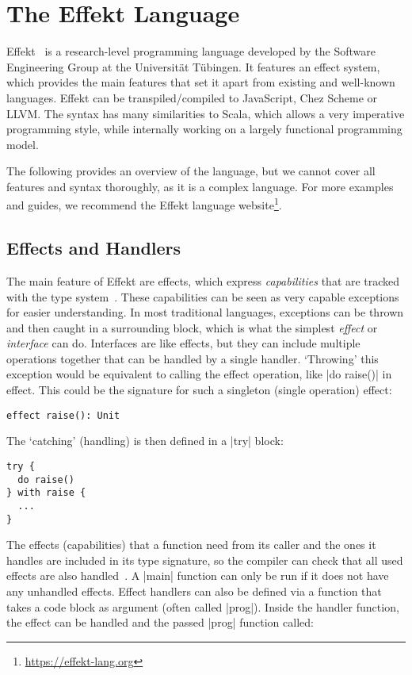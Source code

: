 \chapter{The Effekt Language}\label{chap:effekt}

Effekt~\cite{brachthauser2020effects} is a research-level programming language developed by the Software Engineering Group at the Universität Tübingen. It features an effect system, which provides the main features that set it apart from existing and well-known languages. Effekt can be transpiled/compiled to JavaScript, Chez Scheme or LLVM. The syntax has many similarities to Scala, which allows a very imperative programming style, while internally working on a largely functional programming model.

The following provides an overview of the language, but we cannot cover all features and syntax thoroughly, as it is a complex language. For more examples and guides, we recommend the Effekt language website\footnote{\url{https://effekt-lang.org}}.

\section{Effects and Handlers}

The main feature of Effekt are effects, which express \textit{capabilities} that are tracked with the type system~\cite{brachthauser2020effects}. These capabilities can be seen as very capable exceptions for easier understanding. In most traditional languages, exceptions can be thrown and then caught in a surrounding block, which is what the simplest \textit{effect} or \textit{interface} can do. Interfaces are like effects, but they can include multiple operations together that can be handled by a single handler. `Throwing' this exception would be equivalent to calling the effect operation, like |do raise()| in effect. This could be the signature for such a singleton (single operation) effect:

\begin{lstlisting}
effect raise(): Unit
\end{lstlisting}

The `catching' (handling) is then defined in a |try| block:

\begin{lstlisting}
try {
  do raise()
} with raise {
  ...
}
\end{lstlisting}

The effects (capabilities) that a function need from its caller and the ones it handles are included in its type signature, so the compiler can check that all used effects are also handled~\cite{brachthauser2022effects}. A |main| function can only be run if it does not have any unhandled effects. Effect handlers can also be defined via a function that takes a code block as argument (often called |prog|). Inside the handler function, the effect can be handled and the passed |prog| function called:

